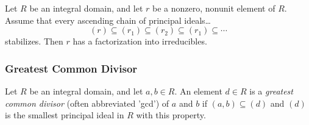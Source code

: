 \begin{proposition}
\label{acc}
Let $R$ be an integral domain, and let $r$ be a nonzero, nonunit element of $R$. Assume that every ascending chain of principal ideals\dots
$$(r) \subseteq (r_1) \subseteq (r_2) \subseteq (r_1) \subseteq \cdots$$
stabilizes. Then $r$ has a factorization into irreducibles.
\end{proposition}

\subsubsection{Greatest Common Divisor}\label{gcd}
Let $R$ be an integral domain, and let $a,b \in R$. An element $d \in R$ is a \emph{greatest common divisor} (often abbreviated 'gcd') of
$a$ and $b$ if $(a,b) \subseteq (d)$ and $(d)$ is the smallest principal ideal in $R$ with this property.